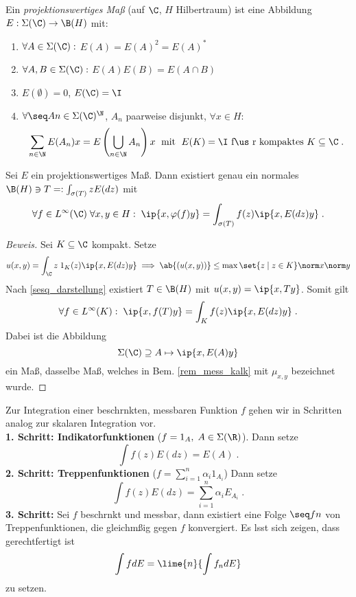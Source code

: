 	\begin{definition}
		Ein \textit{projektionswertiges Ma\ss{}} (auf $\C$, $H$ Hilbertraum) ist eine Abbildung \(E:\Sigma(\C)\to \B(H)\) mit:
		\begin{enumerate}
			\item \(\forall A \in \Sigma(\C):\) \(E(A) = E(A)^2 = E(A)^*\)
			\item \(\forall A, B \in \Sigma(\C):\) \(E(A)E(B) = E(A\cap B)\)
			\item \(E(\emptyset) = 0\), \(E(\C) = \I\)
			\item \(\forall \seq An \in\Sigma(\C)^\N\), $A_n$ paarweise disjunkt, \(\forall x\in H:\)
			\[\sum_{n\in\N}E(A_n)x = E\left(\bigcup_{n\in\N}A_n\right)x\;\text{ mit }\; E(K) = \I \text{ f\us r kompaktes }K\subseteq \C\;.\]
		\end{enumerate}
	\end{definition}
	
	\begin{theorem}
		Sei $E$ ein projektionswertiges Ma\ss{}. Dann existiert genau ein normales \(\B(H)\ni T =: \int_{\sigma(T)} z E(dz)\) mit
		\[\forall f \in L^\infty(\C)\;\forall x, y\in H:\; \ip{x,\varphi(f)y} = \int_{\sigma(T)} f(z)\ip{x,E(dz)y}\;.\]
	\end{theorem}
		\begin{proof}[Beweis]
			Sei $K\subseteq \C$ kompakt. Setze
			\[u(x,y) = \int_{\C} z \;1_K(z) \ip{x, E(dz)y} \implies \ab{(u(x,y))} \leq \max\set{z\;\vert\;z\in K}\norm x\norm y\]
			Nach \ref{sesq_darstellung} existiert \(T\in \B(H)\) mit \(u(x,y) = \ip{x,Ty}\). Somit gilt 
			\[\forall f \in L^\infty(K):\; \ip{x, f(T)y} = \int_K f(z) \ip{x, E(dz) y}\;.\]
			Dabei ist die Abbildung 
			\[\Sigma(\C) \supseteq A \mapsto \ip{x, E(A)y}\]
			ein Ma\ss{}, dasselbe Ma\ss{}, welches in Bem. \ref{rem_mess_kalk} mit \(\mu_{x,y}\) bezeichnet wurde.
		\end{proof}
		\begin{rem}
			Zur Integration einer beschr\as nkten, messbaren Funktion $f$ gehen wir in Schritten analog zur skalaren Integration vor.\\
			\textbf{1. Schritt: Indikatorfunktionen} (\(f = 1_A,\; A\in\Sigma(\R)\)). Dann setze
			\[\int f(z) E(dz) = E(A)\;.\]
			\textbf{2. Schritt: Treppenfunktionen} (\(f = \sum_{i=1}^n \alpha_i 1_{A_i}\)) Dann setze
			\[\int f(z) E(dz) = \sum_{i=1}^n \alpha_i E_{A_i}\;.\]
			\textbf{3. Schritt:} Sei $f$ beschr\as nkt und messbar, dann existiert eine Folge \(\seq fn\) von Treppenfunktionen, die gleichm\as \ss{}ig gegen $f$ konvergiert. Es l\as sst sich zeigen, dass gerechtfertigt ist
			\[\int f dE = \lime{n}{\int f_n dE}\]
			zu setzen.
		\end{rem}
		
